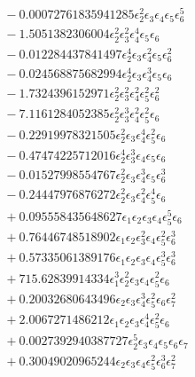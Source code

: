 \documentclass[10pt]{article}
\begin{document}
\begin{align*}
&{}  - 0.00072761835941285 \epsilon_{2}^{2} \epsilon_{3} \epsilon_{4} \epsilon_{5} \epsilon_{6}^{5} \\
&{}  - 1.5051382306004 \epsilon_{2}^{2} \epsilon_{3}^{2} \epsilon_{4}^{4} \epsilon_{5} \epsilon_{6} \\
&{}  - 0.012284437841497 \epsilon_{2}^{4} \epsilon_{3} \epsilon_{4}^{2} \epsilon_{5} \epsilon_{6}^{2} \\
&{}  - 0.024568875682994 \epsilon_{2}^{4} \epsilon_{3} \epsilon_{4}^{3} \epsilon_{5} \epsilon_{6} \\
&{}  - 1.7324396152971 \epsilon_{2}^{2} \epsilon_{3}^{2} \epsilon_{4}^{2} \epsilon_{5}^{2} \epsilon_{6}^{2} \\
&{}  - 7.1161284052385 \epsilon_{2}^{2} \epsilon_{3}^{3} \epsilon_{4}^{2} \epsilon_{5}^{2} \epsilon_{6} \\
&{}  - 0.22919978321505 \epsilon_{2}^{2} \epsilon_{3} \epsilon_{4}^{4} \epsilon_{5}^{2} \epsilon_{6} \\
&{}  - 0.47474225712016 \epsilon_{2}^{4} \epsilon_{3}^{3} \epsilon_{4} \epsilon_{5} \epsilon_{6} \\
&{}  - 0.01527998554767 \epsilon_{2}^{2} \epsilon_{3} \epsilon_{4}^{3} \epsilon_{5} \epsilon_{6}^{3} \\
&{}  - 0.24447976876272 \epsilon_{2}^{2} \epsilon_{3} \epsilon_{4}^{2} \epsilon_{5}^{4} \epsilon_{6} \\
&{}  + 0.095558435648627 \epsilon_{1} \epsilon_{2} \epsilon_{3} \epsilon_{4} \epsilon_{5}^{5} \epsilon_{6} \\
&{}  + 0.76446748518902 \epsilon_{1} \epsilon_{2} \epsilon_{3}^{2} \epsilon_{4} \epsilon_{5}^{2} \epsilon_{6}^{3} \\
&{}  + 0.57335061389176 \epsilon_{1} \epsilon_{2} \epsilon_{3} \epsilon_{4} \epsilon_{5}^{3} \epsilon_{6}^{3} \\
&{}  + 715.62839914334 \epsilon_{1}^{3} \epsilon_{2}^{2} \epsilon_{3} \epsilon_{4} \epsilon_{5}^{2} \epsilon_{6} \\
&{}  + 0.20032680643496 \epsilon_{2} \epsilon_{3} \epsilon_{4}^{3} \epsilon_{5}^{2} \epsilon_{6} \epsilon_{7}^{2} \\
&{}  + 2.0067271486212 \epsilon_{1} \epsilon_{2} \epsilon_{3} \epsilon_{4}^{4} \epsilon_{5}^{2} \epsilon_{6} \\
&{}  + 0.0027392940387727 \epsilon_{2}^{5} \epsilon_{3} \epsilon_{4} \epsilon_{5} \epsilon_{6} \epsilon_{7} \\
&{}  + 0.30049020965244 \epsilon_{2} \epsilon_{3} \epsilon_{4} \epsilon_{5}^{2} \epsilon_{6}^{3} \epsilon_{7}^{2} \\

\end{align*}
\end{document}
